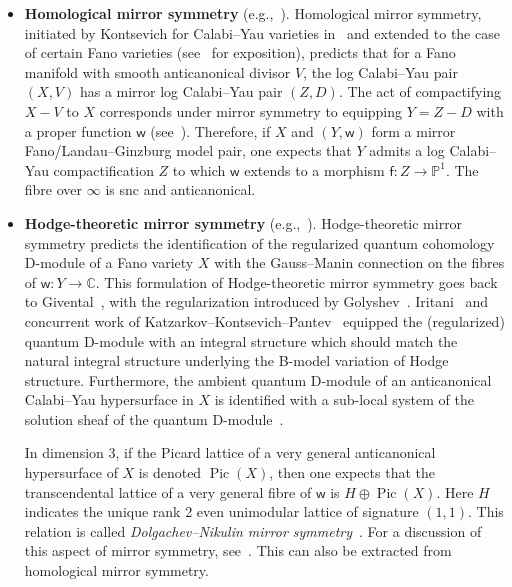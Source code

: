\documentclass[10pt]{amsart}
\numberwithin{equation}{section}
\theoremstyle{plain}
\theoremstyle{definition}
\theoremstyle{remark}
\DeclareMathOperator{\Pic}{Pic}
\begin{document}
\begin{itemize}[\quad -]

\item \textbf{Homological mirror symmetry} (e.g.,~\cite{katzarkov2008hodge,katzarkov2017bogomolov}). Homological mirror symmetry, initiated by Kontsevich for Calabi--Yau varieties in~\cite{kontsevich1994homological} and extended to the case of certain Fano varieties (see~\cite{seidel2001vanishing} for exposition), predicts that for a Fano manifold with smooth anticanonical divisor \(V\), the log Calabi--Yau pair \((X,V)\) has a mirror log Calabi--Yau pair \((Z,D)\). The act of compactifying \(X - V\) to \(X\) corresponds under mirror symmetry to equipping \(Y = Z-D\) with a proper function \(\mathsf{w}\) (see~\cite{auroux2007mirror}). Therefore, if \(X\) and \((Y,\mathsf{w})\) form a mirror Fano/Landau--Ginzburg model pair, one expects that \(Y\) admits a log Calabi--Yau compactification \(Z\) to which \(\mathsf{w}\) extends to a morphism \(\mathsf{f} \colon Z\rightarrow \mathbb{P}^1\). The fibre over \(\infty\) is snc and anticanonical.

\item \textbf{Hodge-theoretic mirror symmetry} (e.g.,~\cite{iritani2009integral,iritani2016quantum}). Hodge-theoretic mirror symmetry predicts the identification of the regularized quantum cohomology D-module of a Fano variety \(X\) with the Gauss--Manin connection on the fibres of \(\mathsf{w}: Y\rightarrow \mathbb{C}\). This formulation of Hodge-theoretic mirror symmetry goes back to Givental~\cite{givental1998mirror}, with the regularization introduced by Golyshev~\cite{golyshev2004modularity}. Iritani~\cite{iritani2009integral} and concurrent work of Katzarkov--Kontsevich--Pantev~\cite{katzarkov2008hodge} equipped the (regularized) quantum D-module with an integral structure  which should match the natural integral structure underlying the B-model variation of Hodge structure. Furthermore, the ambient quantum D-module of an anticanonical Calabi--Yau hypersurface in \(X\) is identified with a sub-local system of the solution sheaf of the quantum D-module~\cite{iritani2011quantum,iritani2016quantum}.

  In dimension 3, if the Picard lattice of a very general anticanonical hypersurface of \(X\) is denoted \(\Pic(X)\), then one expects that the transcendental lattice of a very general fibre of \(\mathsf{w}\) is \(H \oplus \Pic(X)\). Here \(H\) indicates the unique rank 2 even unimodular lattice of signature \((1,1)\). This relation is called \emph{Dolgachev--Nikulin mirror symmetry}~\cite{dolgachev1996mirror}. For a discussion of this aspect of mirror symmetry, see~\cite{ueda2020mirror}. This can also be extracted from homological mirror symmetry.


\end{itemize}
\end{document}
